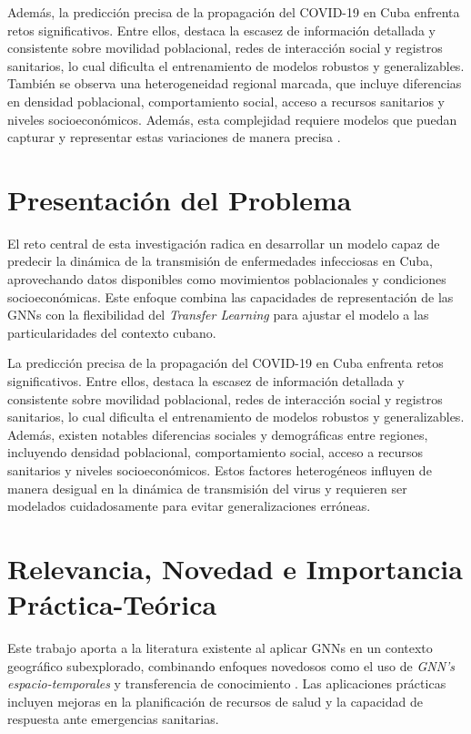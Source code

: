 Además, la predicción precisa de la propagación del COVID-19 en Cuba enfrenta retos significativos. Entre ellos, destaca la escasez de información detallada y consistente sobre movilidad poblacional, redes de interacción social y registros sanitarios, lo cual dificulta el entrenamiento de modelos robustos y generalizables. También se observa una heterogeneidad regional marcada, que incluye diferencias en densidad poblacional, comportamiento social, acceso a recursos sanitarios y niveles socioeconómicos. Además, esta complejidad requiere modelos que puedan capturar y representar estas variaciones de manera precisa \parencite{Rodriguez2022DataCentric, Panagopoulos_Nikolentzos_Vazirgiannis_2021}.

\section*{Presentación del Problema}
El reto central de esta investigación radica en desarrollar un modelo capaz de predecir la dinámica de la transmisión de enfermedades infecciosas en Cuba, aprovechando datos disponibles como movimientos poblacionales y condiciones socioeconómicas. Este enfoque combina las capacidades de representación de las GNNs con la flexibilidad del \textit{Transfer Learning} para ajustar el modelo a las particularidades del contexto cubano.

La predicción precisa de la propagación del COVID-19 en Cuba enfrenta retos significativos. Entre ellos, destaca la escasez de información detallada y consistente sobre movilidad poblacional, redes de interacción social y registros sanitarios, lo cual dificulta el entrenamiento de modelos robustos y generalizables. Además, existen notables diferencias sociales y demográficas entre regiones, incluyendo densidad poblacional, comportamiento social, acceso a recursos sanitarios y niveles socioeconómicos. Estos factores heterogéneos influyen de manera desigual en la dinámica de transmisión del virus y requieren ser modelados cuidadosamente para evitar generalizaciones erróneas.

\section*{Relevancia, Novedad e Importancia Práctica-Teórica}
Este trabajo aporta a la literatura existente al aplicar GNNs en un contexto geográfico subexplorado, combinando enfoques novedosos como el uso de \textit{GNN's espacio-temporales} y transferencia de conocimiento \parencite{Nguyen2023NZSTGNN, Zheng2024HeatGNN}. Las aplicaciones prácticas incluyen mejoras en la planificación de recursos de salud y la capacidad de respuesta ante emergencias sanitarias.

